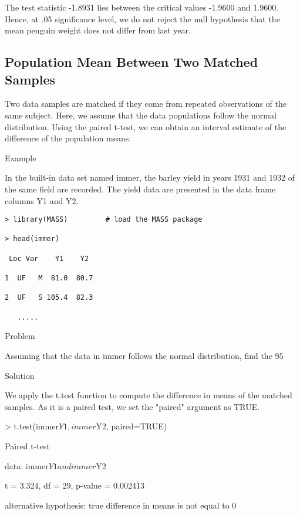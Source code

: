 The test statistic -1.8931 lies between the critical values -1.9600 and 1.9600. Hence, at .05 significance level, we do not reject the null hypothesis that the mean penguin weight does not differ from last year.

\subsection{Population Mean Between Two Matched Samples}

Two data samples are matched if they come from repeated observations of the same subject. Here, we assume that the data populations follow the normal distribution. Using the paired t-test, we can obtain an interval estimate of the difference of the population means.


Example

In the built-in data set named immer, the barley yield in years 1931 and 1932 of the same field are recorded. The yield data are presented in the data frame columns Y1 and Y2.

\begin{framed}
\begin{verbatim}
> library(MASS)         # load the MASS package 

> head(immer) 

 Loc Var    Y1    Y2 

1  UF   M  81.0  80.7 

2  UF   S 105.4  82.3 

   .....

\end{verbatim}
\end{framed}
Problem

Assuming that the data in immer follows the normal distribution, find the 95%

Solution

We apply the t.test function to compute the difference in means of the matched samples. As it is a paired test, we set the "paired" argument as TRUE.

> t.test(immer$Y1, immer$Y2, paired=TRUE) 



          Paired t-test 



data:  immer$Y1 and immer$Y2 

t = 3.324, df = 29, p-value = 0.002413 

alternative hypothesis: true difference in means is not equal to 0 

